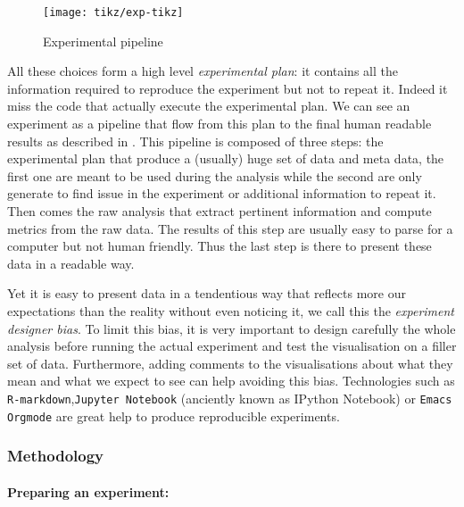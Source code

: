 \begin{figure}[htb]
    \centering
    \texttt{[image: tikz/exp-tikz]}
    \caption{Experimental pipeline}
    \label{fig:exp-pipeline}
\end{figure}

All these choices form a high level \emph{experimental plan}: it contains all
the information required to reproduce the experiment but not to repeat it.
Indeed it miss the code that actually execute the experimental plan.
We can see an experiment as a pipeline that flow from this plan to the final
human readable results as described in . This pipeline is
composed of three steps: the experimental plan that produce a (usually) huge
set of data and meta data, the first one are meant to be used during the
analysis while the second are only generate to find issue in the experiment or
additional information to repeat it. Then comes the raw analysis that extract
pertinent information and compute metrics from the raw data. The results of
this step are usually easy to parse for a computer but not human friendly.
Thus the last step is there to present these data in a readable way.

Yet it is easy to present data in a tendentious way that reflects more our
expectations than the reality without even noticing it, we call this the
\emph{experiment designer bias}. To limit this bias,
it is very important to design carefully the whole analysis before running the
actual experiment and test the visualisation on a filler set of data.
Furthermore, adding comments to the visualisations about what they mean and
what we expect to see can help avoiding this bias. Technologies such as
\texttt{R-markdown},\texttt{Jupyter Notebook} (anciently known as IPython
Notebook) or \texttt{Emacs Orgmode} are great help to produce reproducible
experiments.

\subsubsection{Methodology}

\paragraph{Preparing an experiment:}

